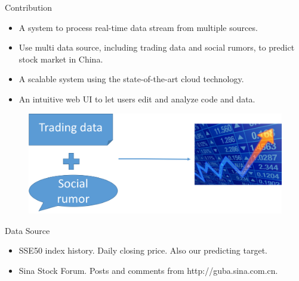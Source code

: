 \documentclass[final,hyperref={pdfpagelabels=false}]{beamer}
\begin{document}
\begin{frame}[t]
\begin{columns}[t]
\begin{column}{.445\textwidth}

\begin{block}{Contribution}

\begin{itemize}
\item A system to process real-time data stream from multiple sources. 
\item Use multi data source, including trading data and social rumors, to predict stock market in China.
\item A scalable system using the state-of-the-art cloud technology. 
\item An intuitive web UI to let users edit and analyze code and data.
\end{itemize}
\centering
\begin{figure}
\includegraphics[width=0.5\linewidth]{intuition.png}
\label{sample}
\end{figure}

\end{block}


\begin{block}{Data Source}



\begin{itemize}
\item SSE50 index history. Daily closing price. Also our predicting target.
\item Sina Stock Forum. Posts and comments from http://guba.sina.com.cn.



\end{itemize}
\end{block}
\end{column}
\end{columns}
\end{frame}
\end{document}
